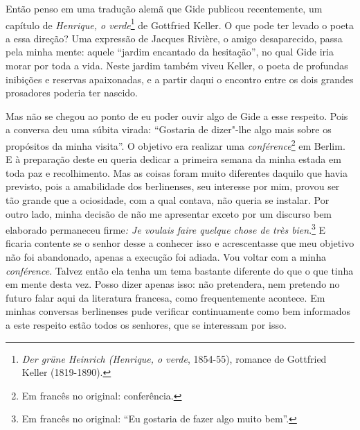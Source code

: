 Então penso em uma tradução alemã que Gide publicou recentemente, um
capítulo de \emph{Henrique, o verde}\footnote{\emph{Der grüne
  Heinrich (\emph{Henrique, o verde}}, 1854-55), romance de Gottfried Keller
  (1819-1890). \versal{[N. E.]}} de Gottfried Keller. O que pode ter levado o poeta a
essa direção? Uma expressão de Jacques Rivière, o amigo desaparecido,
passa pela minha mente: aquele ``jardim encantado da hesitação'', no
qual Gide iria morar por toda a vida. Neste jardim também viveu Keller,
o poeta de profundas inibições e reservas apaixonadas, e a partir daqui
o encontro entre os dois grandes prosadores poderia ter nascido.

Mas não se chegou ao ponto de eu poder ouvir algo de Gide a esse
respeito. Pois a conversa deu uma súbita virada: ``Gostaria de dizer"-lhe
algo mais sobre os propósitos da minha visita''. O objetivo era realizar
uma \emph{conférence}\footnote{Em francês no original: conferência. \versal{[N. T.]}} em Berlim. E à preparação deste eu queria dedicar a
primeira semana da minha estada em toda paz e recolhimento. Mas as
coisas foram muito diferentes daquilo que havia previsto, pois a
amabilidade dos berlinenses, seu interesse por mim, provou ser tão
grande que a ociosidade, com a qual contava, não queria se instalar. Por
outro lado, minha decisão de não me apresentar exceto por um discurso
bem elaborado permaneceu firme\emph{: Je voulais faire quelque chose de
très bien}.\footnote{Em francês no original: ``Eu gostaria de fazer algo muito bem''. \versal{[N. T.]}}
E ficaria contente se o senhor desse a conhecer isso e acrescentasse que
meu objetivo não foi abandonado, apenas a execução foi adiada. Vou
voltar com a minha \emph{conférence}.
Talvez então ela tenha um tema bastante diferente do que o que tinha em
mente desta vez. Posso dizer apenas isso: não pretendera, nem pretendo
no futuro falar aqui da literatura francesa, como frequentemente
acontece. Em minhas conversas berlinenses pude verificar continuamente
como bem informados a este respeito estão todos os senhores, que se
interessam por isso.

